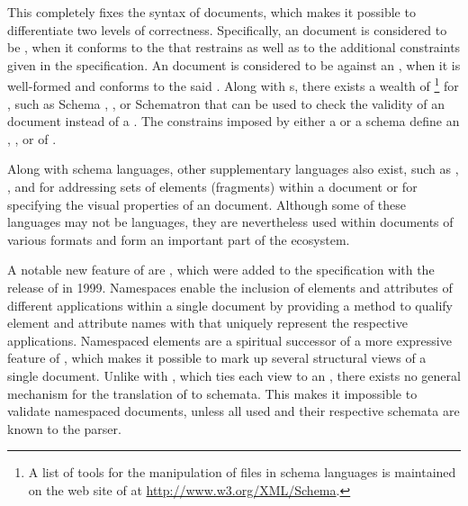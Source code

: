 \documentclass{book}
\begin{document}
This  completely fixes the syntax of  documents, which
makes it possible to differentiate two levels of correctness. Specifically, an
 document is considered to be %
, when it conforms to the 
 that restrains  as well as to the additional
constraints given in the specification. An  document is
considered to be   against an
 , when it is well-formed and conforms to the said
 .  Along with s, there exists a wealth
of \footnote{
  A list of tools for the manipulation of files in  schema
  languages is maintained on the web site of  at
  \url{http://www.w3.org/XML/Schema}.
} for , such as   Schema
, , or Schematron that can be used to
check the validity of an  document instead of a .
The constrains imposed by either a  or a schema define an
, , or 
 
 of .

Along with schema languages, other supplementary languages also exist, such as
, , and  for addressing sets of elements
(fragments) within a  document or  for specifying the
visual properties of an  document. Although some of these
languages may not be  languages, they are nevertheless used within
documents of various  formats and form an important part of the
ecosystem.

A notable new feature of  are %
, which were added to the specification with the
release of \cite{bray99} in 1999. Namespaces enable the inclusion of elements
and attributes of different  applications within a single
 document by providing a method to qualify element and attribute
names with  that uniquely represent the respective 
applications. Namespaced elements are a spiritual successor of a more expressive
 feature of , which makes it possible to
mark up several structural views of a single document. Unlike with
, which ties each view to an  ,
there exists no general mechanism for the translation of  to
 schemata.  This makes it impossible to validate namespaced
 documents, unless all used  and their respective
schemata are known to the parser.
\end{document}
